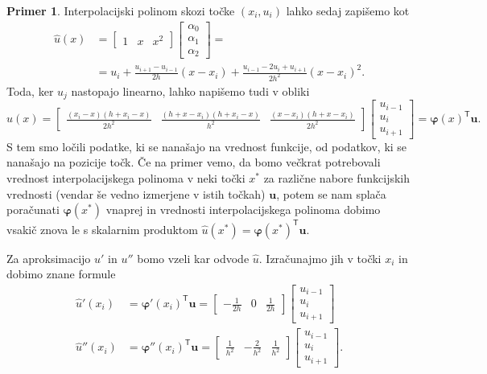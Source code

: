 \documentclass[12pt,a4paper,twoside]{article}
\theoremstyle{definition} %
\newtheorem{primer}[definicija]{Primer}
\theoremstyle{plain} %
\numberwithin{equation}{section}
\newcommand{\T}{\mathsf{T}}
\renewcommand{\b}{\boldsymbol}
\renewcommand{\phi}{\varphi}
\begin{document}
\begin{primer}
Interpolacijski polinom skozi točke $(x_i, u_i)$ lahko sedaj zapišemo kot
\begin{align*}
  \hat{u}(x) &=
  \begin{bmatrix}
    1 & x & x^2
  \end{bmatrix}
  \begin{bmatrix}
    \alpha_0 \\ \alpha_1 \\ \alpha_2
  \end{bmatrix} = \\
  &= u_i +\frac{u_{i+1}-u_{i-1}}{2 h}(x-x_i)+\frac{u_{i-1}-2 u_{i}+u_{i+1}}{2
  h^2}(x-x_i)^2.
\end{align*}
Toda, ker $u_j$ nastopajo linearno, lahko napišemo tudi v obliki
\[
  \hat{u}(x) =
  \begin{bmatrix}
  \frac{(x_i-x) (h+x_i-x)}{2 h^2} & \frac{(h+x-x_i)(h+x_i-x)}{h^2} & \frac{(x-x_i) (h+x-x_i)}{2 h^2}
  \end{bmatrix}
  \begin{bmatrix}
    u_{i-1} \\ u_{i} \\ u_{i+1}
  \end{bmatrix}= \b\phi(x)^\T\b u.
\]
S tem smo ločili podatke, ki se nanašajo na vrednost funkcije, od podatkov, ki
se nanašajo na pozicije točk. Če na primer vemo, da bomo večkrat potrebovali
vrednost interpolacijskega polinoma v neki točki $x^\ast$ za različne nabore
funkcijskih vrednosti (vendar še vedno izmerjene v istih točkah) $\b u$, potem
se nam splača poračunati $\b\phi(x^\ast)$ vnaprej in vrednosti
interpolacijskega polinoma dobimo vsakič znova le s skalarnim produktom $\hat
u(x^\ast) = \b\phi(x^\ast) ^\T \b u$.

Za aproksimacijo $u'$ in $u''$ bomo vzeli kar odvode $\hat{u}$. Izračunajmo
jih v točki $x_i$ in dobimo znane formule
\begin{align*}
  \hat u'(x_i) &= \b\phi'(x_i)^\T \b u =
  \begin{bmatrix}
    -\frac{1}{2h} & 0 & \frac{1}{2h}
  \end{bmatrix} \begin{bmatrix}
    u_{i-1} \\ u_{i} \\ u_{i+1}
  \end{bmatrix}\\
  \hat u''(x_i) &= \b\phi''(x_i)^\T \b u =
  \begin{bmatrix}
    \frac{1}{h^2} & -\frac{2}{h^2} & \frac{1}{h^2}
  \end{bmatrix}\begin{bmatrix}
    u_{i-1} \\ u_{i} \\ u_{i+1}
  \end{bmatrix}.
\end{align*}


\end{primer}
\end{document}
